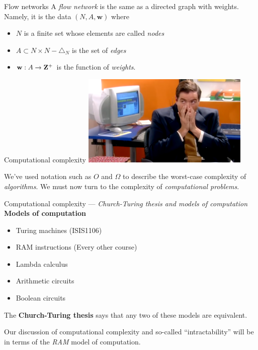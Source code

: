 %

\begin{frame}{Flow networks}
	A \emph{flow network} is the same as a directed graph with weights. Namely,
	it is the data $(N, A, \mathbf{w})$ where
	\begin{itemize}
		\item $N$ is a finite set whose elements are called \emph{nodes}
		\item $A \subset N \times N - \triangle_N$ is the set of \emph{edges}
		\item $\mathbf{w}: A \to \mathbf{Z}^+$ is the function of \emph{weights}.
	\end{itemize}
\end{frame}

%

\begin{frame}{Computational complexity}
	\includegraphics[width= 0.6\textwidth]{mario.png}

	\bigskip

	\pause
	We've used notation such as $O$ and $\Omega$ to describe the worst-case complexity of
	\emph{algorithms}. We must now turn to the complexity of \emph{computational problems}. 
\end{frame}

%

\begin{frame}{Computational complexity --- \emph{Church-Turing thesis and models of computation}}
	\textbf{Models of computation}
	\begin{itemize}
		\item Turing machines \checkmark (ISIS1106)
		\item RAM instructions \checkmark (Every other course)
		\item Lambda calculus
		\item Arithmetic circuits
		\item Boolean circuits
	\end{itemize}

	\bigskip

	\pause
	The \textbf{Church-Turing thesis} says that any two of these models are equivalent.

	\bigskip

	\pause
	Our discussion of computational complexity and so-called ``intractability'' will be in
	terms of the \emph{RAM} model of computation. 
\end{frame}

